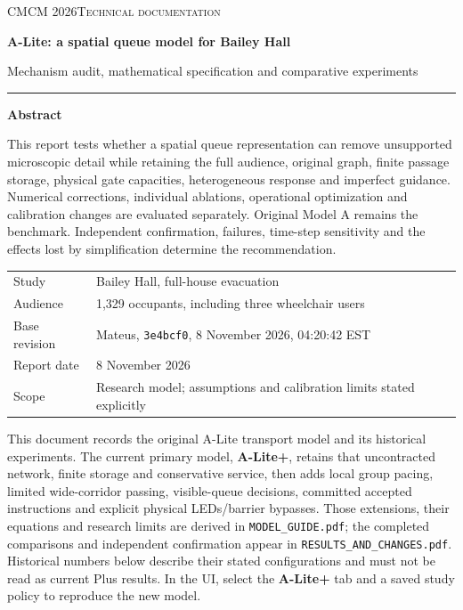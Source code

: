 \documentclass[11pt,a4paper]{article}
\newcommand{\code}[1]{{\small\nolinkurl{#1}}}
\begin{document}
\begin{titlepage}
\thispagestyle{empty}
{\small\scshape CMCM 2026\quad Technical documentation}\par
\vspace{22mm}
{\Huge\bfseries A-Lite: a spatial queue model for Bailey Hall\par}
\vspace{7mm}
{\Large Mechanism audit, mathematical specification and comparative experiments\par}
\vspace{12mm}
{\color{ink}\rule{\linewidth}{0.7pt}}\par
\vspace{5mm}
\textbf{Abstract}\par
This report tests whether a spatial queue representation can remove unsupported microscopic detail while retaining the full audience, original graph, finite passage storage, physical gate capacities, heterogeneous response and imperfect guidance. Numerical corrections, individual ablations, operational optimization and calibration changes are evaluated separately. Original Model A remains the benchmark. Independent confirmation, failures, time-step sensitivity and the effects lost by simplification determine the recommendation.
\vfill
\begin{tabular}{@{}ll@{}}
Study & Bailey Hall, full-house evacuation\\
Audience & 1,329 occupants, including three wheelchair users\\
Base revision & Mateus, \texttt{3e4bcf0}, 8 November 2026, 04:20:42 EST\\
Report date & 8 November 2026\\
Scope & Research model; assumptions and calibration limits stated explicitly
\end{tabular}
\vspace{9mm}
\end{titlepage}
{\small\tableofcontents}
\clearpage
{}
This document records the original A-Lite transport model and its historical experiments. The current primary model, \textbf{A-Lite+}, retains that uncontracted network, finite storage and conservative service, then adds local group pacing, limited wide-corridor passing, visible-queue decisions, committed accepted instructions and explicit physical LEDs/barrier bypasses. Those extensions, their equations and research limits are derived in \code{MODEL_GUIDE.pdf}; the completed comparisons and independent confirmation appear in \code{RESULTS_AND_CHANGES.pdf}. Historical numbers below describe their stated configurations and must not be read as current Plus results. In the UI, select the \textbf{A-Lite+} tab and a saved study policy to reproduce the new model.
\end{document}
